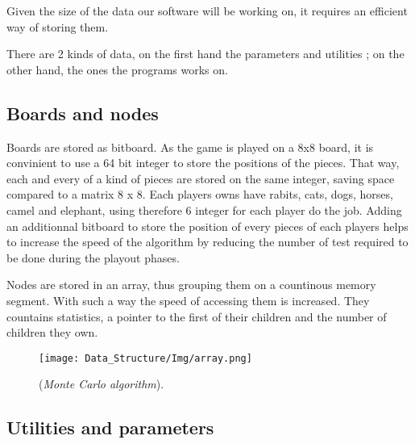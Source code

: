 Given the size of the data our software will be working on, it requires an efficient way of storing them.

There are 2 kinds of data, on the first hand the parameters and utilities ; on the other hand, the ones the programs works on.
\subsection{Boards and nodes}
Boards are stored as bitboard. As the game is played on a 8x8 board, it is convinient to use a 64 bit integer to store the positions of the pieces.
That way, each and every of a kind of pieces are stored on the same integer, saving space compared to a matrix 8 x 8.
Each players owns have rabits, cats, dogs, horses, camel and elephant, using therefore 6 integer for each player do the job. Adding an additionnal bitboard to store the position of every pieces of each players helps to increase the speed of the algorithm by reducing the number of test required to be done during the playout phases.

Nodes are stored in an array, thus grouping them on a countinous memory segment. With such a way the speed of accessing them is increased.
They countains statistics, a pointer to the first of their children and the number of children they own.

\begin{figure}[!h] 
\centerline{\texttt{[image: Data\_Structure/Img/array.png]}}
\caption{\label{fig:array}(\textit{Monte Carlo algorithm}).}
\end{figure}


\subsection{Utilities and parameters}
